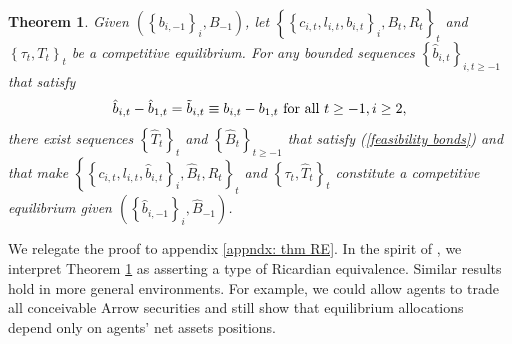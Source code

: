 \documentclass[thmsb,11pt]{article}
\newtheorem{theorem}{Theorem}
\begin{document}
\begin{theorem}
\label{theorem: main} Given $\left( \left \{ b_{i,-1}\right \}
_{i},B_{-1}\right) $, let $\left \{ \left \{ c_{i,t},l_{i,t},b_{i,t}\right \} _{i},B_{t},R_{t}\right \} _{t} $ and $\left \{ \tau _{t},T_{t}\right
\} _{t}$ be a competitive equilibrium. For any bounded sequences $%
\left \{ \hat{b}_{i,t}\right \} _{i,t\geq -1}$ that satisfy
\begin{equation*}
\hat{b}_{i,t}-\hat{b}_{1,t}=\tilde{b}_{i,t}\equiv b_{i,t}	-b_{1,t} \ \text{\rm  for all }t\geq -1,i\geq 2,
\end{equation*}%
there exist  sequences $\left \{ \hat{T}_{t}\right \} _{t}$ and $%
\left \{ \hat{B}_{t}\right \} _{t\geq -1}$ that satisfy (\ref{feasibility
bonds}) and that make $\left \{ \left \{ c_{i,t},l_{i,t},\hat{b}%
_{i,t}\right \} _{i},\hat{B}_{t},R_{t}\right \} _{t}$ and $\left \{
\tau _{t},\hat{T}_{t}\right \} _{t}$ constitute a competitive
equilibrium given $\left( \left \{ \hat{b}_{i,-1}\right \} _{i},\hat{B}%
_{-1}\right) $.
\end{theorem}

We relegate the proof to appendix \ref{appndx: thm RE}. In the spirit of \citet{Barro1974}, we interpret Theorem \ref{theorem: main} as  asserting a type of  Ricardian equivalence.
Similar results  hold in more general environments. For example, we could allow
agents to trade all conceivable  Arrow securities and still show that  equilibrium allocations depend only on agents' net assets positions.
\end{document}
